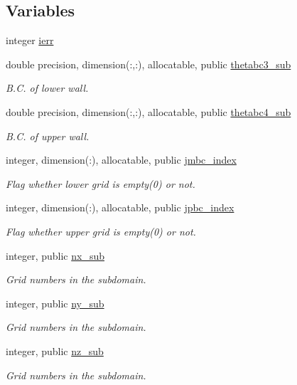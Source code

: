 \subsection*{Variables}
\begin{DoxyCompactItemize}
\item 
integer \mbox{\hyperlink{namespacempi__subdomain_acd16f258caed20a7d8d38cd28ae64688}{ierr}}
\item 
double precision, dimension(\+:,\+:), allocatable, public \mbox{\hyperlink{namespacempi__subdomain_ad61f27caf5f32301a077e21363c2d73b}{thetabc3\+\_\+sub}}
\begin{DoxyCompactList}\small\item\em B.\+C. of lower wall. \end{DoxyCompactList}\item 
double precision, dimension(\+:,\+:), allocatable, public \mbox{\hyperlink{namespacempi__subdomain_ad1705bede0c0d39ad16f9f94afe32be6}{thetabc4\+\_\+sub}}
\begin{DoxyCompactList}\small\item\em B.\+C. of upper wall. \end{DoxyCompactList}\item 
integer, dimension(\+:), allocatable, public \mbox{\hyperlink{namespacempi__subdomain_ac22380b1c941dd6c53cabe7287d185e9}{jmbc\+\_\+index}}
\begin{DoxyCompactList}\small\item\em Flag whether lower grid is empty(0) or not. \end{DoxyCompactList}\item 
integer, dimension(\+:), allocatable, public \mbox{\hyperlink{namespacempi__subdomain_a9adbfdd11c7e9fdb968bb8eef2b13c2b}{jpbc\+\_\+index}}
\begin{DoxyCompactList}\small\item\em Flag whether upper grid is empty(0) or not. \end{DoxyCompactList}\end{DoxyCompactItemize}
\textbf{ }\par
\begin{DoxyCompactItemize}
\item 
integer, public \mbox{\hyperlink{namespacempi__subdomain_a005fe127fe0fc85b932814a820a36444}{nx\+\_\+sub}}
\begin{DoxyCompactList}\small\item\em Grid numbers in the subdomain. \end{DoxyCompactList}\item 
integer, public \mbox{\hyperlink{namespacempi__subdomain_a665ba05d0ae9309dd28b9b513a0c87a1}{ny\+\_\+sub}}
\begin{DoxyCompactList}\small\item\em Grid numbers in the subdomain. \end{DoxyCompactList}\item 
integer, public \mbox{\hyperlink{namespacempi__subdomain_a07555cc931ac78376a4c81207662251f}{nz\+\_\+sub}}
\begin{DoxyCompactList}\small\item\em Grid numbers in the subdomain. \end{DoxyCompactList}\end{DoxyCompactItemize}

